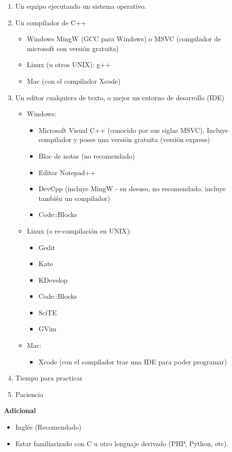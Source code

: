 \begin{enumerate}
\item Un equipo ejecutando un sistema operativo.
\item Un compilador de C++
	\begin{itemize}
	\item Windows MingW (GCC para Windows) o MSVC (compilador de microsoft con versión gratuita)
	\item Linux (u otros UNIX): g++
	\item Mac (con el compilador Xcode)
	\end{itemize}
\item Un editor cualquiera de texto, o mejor un entorno de desarrollo (IDE)
	\begin{itemize}
	\item Windows:
		\begin{itemize}
		\item Microsoft Visual C++ (conocido por sus siglas MSVC). Incluye compilador y posee una versión gratuita (versión express)
		\item Bloc de notas (no recomendado)
		\item Editor Notepad++
		\item DevCpp (incluye MingW - en desuso, no recomendado, incluye también un compilador)
		\item Code::Blocks
		\end{itemize}
	\item Linux (o re-compilación en UNIX):
		\begin{itemize}
		\item Gedit
		\item Kate
		\item KDevelop
		\item Code::Blocks
		\item SciTE
		\item GVim
		\end{itemize}
	\item Mac:
		\begin{itemize}
		\item Xcode (con el compilador trae una IDE para poder programar)
		\end{itemize}
	\end{itemize}
\item Tiempo para practicar
\item Paciencia
\end{enumerate}

\textbf{Adicional}
\begin{itemize}
\item Inglés (Recomendado)
\item Estar familiarizado con C u otro lenguaje derivado (PHP, Python, etc).
\end{itemize}

